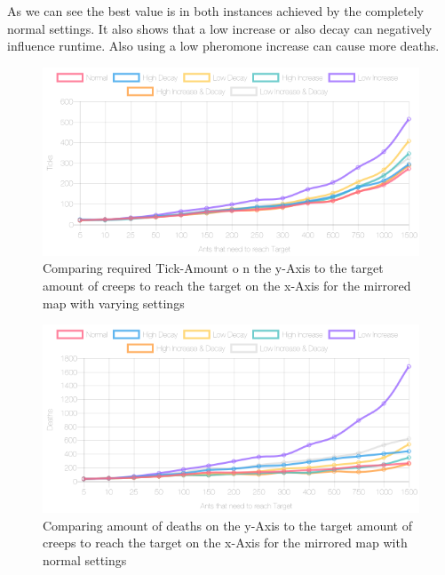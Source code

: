 As we can see the best value is in both instances achieved by the completely normal settings. It also shows that a low increase or also decay can negatively influence runtime. Also using a low pheromone increase can cause more deaths.

\begin{figure}[H]
  \centering
  \includegraphics[width=1\linewidth]{images/mirrorednormalpheromticks}
  \caption{Comparing required Tick-Amount o n the y-Axis to the target amount of creeps to reach the target on the x-Axis for the mirrored map with varying settings}
  \label{fig:diffsettings2}
\end{figure}

\begin{figure}[H]
  \centering
  \includegraphics[width=1\linewidth]{images/mirroredwittowerdeaths}
  \caption{Comparing amount of deaths on the y-Axis to the target amount of creeps to reach the target on the x-Axis for the mirrored map with normal settings}
  \label{fig:diffsetting2sdeath}
\end{figure}